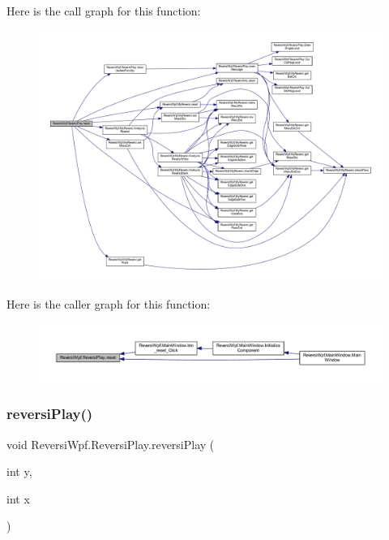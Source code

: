 Here is the call graph for this function\+:
\nopagebreak
\begin{figure}[H]
\begin{center}
\leavevmode
\includegraphics[width=350pt]{class_reversi_wpf_1_1_reversi_play_aee0447f5d955d0b2b66d14b491d90e81_cgraph}
\end{center}
\end{figure}
Here is the caller graph for this function\+:
\nopagebreak
\begin{figure}[H]
\begin{center}
\leavevmode
\includegraphics[width=350pt]{class_reversi_wpf_1_1_reversi_play_aee0447f5d955d0b2b66d14b491d90e81_icgraph}
\end{center}
\end{figure}
\mbox{\label{class_reversi_wpf_1_1_reversi_play_a735fd2b6a5f7be5089f702f5265cd183}} 
\subsubsection{\texorpdfstring{reversi\+Play()}{reversiPlay()}}
{\footnotesize\ttfamily void Reversi\+Wpf.\+Reversi\+Play.\+reversi\+Play (\begin{DoxyParamCaption}\item[{int}]{y,  }\item[{int}]{x }\end{DoxyParamCaption})}



